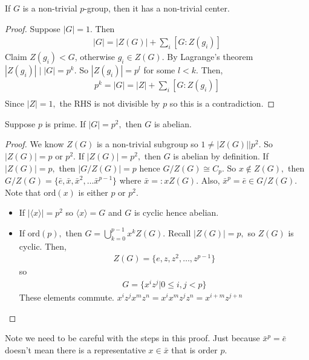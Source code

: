 \documentclass[a4paper]{article}
\begin{document}
\begin{theorem}
    If $G$ is a non-trivial $p$-group, then it has a non-trivial center.
    \begin{proof}
        Suppose $|G|=1.$ Then \begin{align}
            |G|=|Z(G)|+\sum_{i}[G:Z(g_i)]
        \end{align}
        Claim $Z(g_i)<G$, otherwise $g_i\in Z(G).$ By Lagrange's theorem $|Z(g_i)|\mid|G|=p^k.$ So $|Z(g_i)|=p^l$ for some $l<k.$ Then,\begin{align}
            p^k=|G|=|Z|+\sum_{i}[G:Z(g_i)]\\
        \end{align} 
        Since $|Z|=1,$ the RHS is not divisible by $p$ so this is a contradiction.
    \end{proof}
    \begin{corollary}
        Suppose $p$ is prime. If $|G|=p^2,$ then $G$ is abelian.
        \begin{proof}[Proof]
            We know $Z(G)$ is a non-trivial subgroup so $1\neq|Z(G)|\Big|p^2.$ So $|Z(G)|=p$ or $p^2.$ If $|Z(G)|=p^2,$ then $G$ is abelian by definition. If $|Z(G)|=p,$ then $|G/Z(G)|=p$ hence $G/Z(G)\cong C_p.$ So $x\notin Z(G),$ then $G/Z(G)=\{\bar e, \bar x, \bar x^2,\dots\bar x^{p-1}\}$ where $\bar x=:xZ(G).$ Also, $\bar x^p=\bar e\in G/Z(G).$ Note that $\mathrm{ord}(x)$ is either $p$ or $p^2$.
            \begin{itemize}
                \item If $|\langle x\rangle|=p^2$ so $\langle x\rangle=G$ and $G$ is cyclic hence abelian. 
                \item If $\mathrm{ord}(p),$ then $G=\bigcup_{k=0}^{p-1}x^kZ(G).$ Recall $|Z(G)|=p,$ so $Z(G)$ is cyclic. Then, \begin{align}
                    Z(G)=\{e,z,z^2,\dots,z^{p-1}\}
                \end{align}
                so \begin{align}
                    G=\{x^iz^j|0\leq i,j<p\}
                \end{align}
                These elements commute. $x^iz^jx^mz^n=x^ix^mz^jz^n=x^{i+m}z^{j+n}$
            \end{itemize}
        \end{proof}
    \end{corollary}
\end{theorem}
Note we need to be careful with the steps in this proof. Just because $\bar x^p=\bar e$ doesn't mean there is a representative $x\in\bar x$ that is order $p.$
\end{document}
